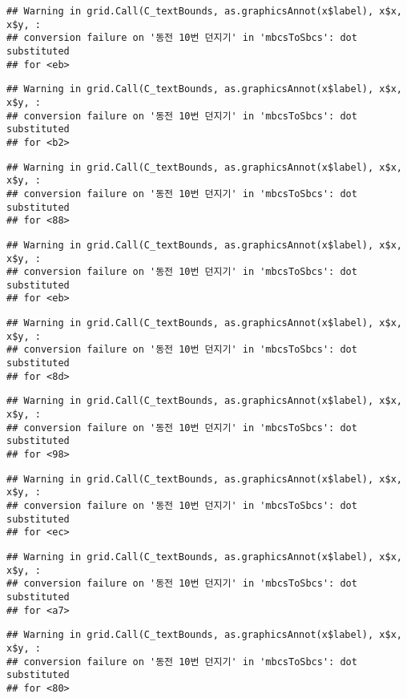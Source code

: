 \documentclass[]{book}
\begin{document}
\begin{verbatim}
## Warning in grid.Call(C_textBounds, as.graphicsAnnot(x$label), x$x, x$y, :
## conversion failure on '동전 10번 던지기' in 'mbcsToSbcs': dot substituted
## for <eb>
\end{verbatim}

\begin{verbatim}
## Warning in grid.Call(C_textBounds, as.graphicsAnnot(x$label), x$x, x$y, :
## conversion failure on '동전 10번 던지기' in 'mbcsToSbcs': dot substituted
## for <b2>
\end{verbatim}

\begin{verbatim}
## Warning in grid.Call(C_textBounds, as.graphicsAnnot(x$label), x$x, x$y, :
## conversion failure on '동전 10번 던지기' in 'mbcsToSbcs': dot substituted
## for <88>
\end{verbatim}

\begin{verbatim}
## Warning in grid.Call(C_textBounds, as.graphicsAnnot(x$label), x$x, x$y, :
## conversion failure on '동전 10번 던지기' in 'mbcsToSbcs': dot substituted
## for <eb>
\end{verbatim}

\begin{verbatim}
## Warning in grid.Call(C_textBounds, as.graphicsAnnot(x$label), x$x, x$y, :
## conversion failure on '동전 10번 던지기' in 'mbcsToSbcs': dot substituted
## for <8d>
\end{verbatim}

\begin{verbatim}
## Warning in grid.Call(C_textBounds, as.graphicsAnnot(x$label), x$x, x$y, :
## conversion failure on '동전 10번 던지기' in 'mbcsToSbcs': dot substituted
## for <98>
\end{verbatim}

\begin{verbatim}
## Warning in grid.Call(C_textBounds, as.graphicsAnnot(x$label), x$x, x$y, :
## conversion failure on '동전 10번 던지기' in 'mbcsToSbcs': dot substituted
## for <ec>
\end{verbatim}

\begin{verbatim}
## Warning in grid.Call(C_textBounds, as.graphicsAnnot(x$label), x$x, x$y, :
## conversion failure on '동전 10번 던지기' in 'mbcsToSbcs': dot substituted
## for <a7>
\end{verbatim}

\begin{verbatim}
## Warning in grid.Call(C_textBounds, as.graphicsAnnot(x$label), x$x, x$y, :
## conversion failure on '동전 10번 던지기' in 'mbcsToSbcs': dot substituted
## for <80>
\end{verbatim}
\end{document}
